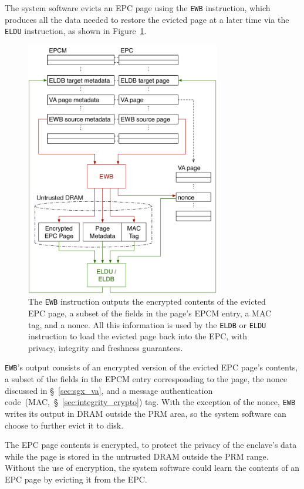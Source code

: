 The system software evicts an EPC page using the \texttt{EWB} instruction,
which produces all the data needed to restore the evicted page at a later time
via the \texttt{ELDU} instruction, as shown in Figure~\ref{fig:sgx_eviction}.

\begin{figure}[hbt]
  \centering
  \includegraphics[width=85mm]{figures/sgx_eviction.pdf}
  \caption{
    The \texttt{EWB} instruction outputs the encrypted contents of the
    evicted EPC page, a subset of the fields in the page's EPCM entry, a
    MAC tag, and a nonce. All this information is used by the \texttt{ELDB} or
    \texttt{ELDU} instruction to load the evicted page back into the EPC, with
    privacy, integrity and freshness guarantees.
  }
  \label{fig:sgx_eviction}
\end{figure}


\texttt{EWB}'s output consists of an encrypted version of the evicted EPC
page's contents, a subset of the fields in the EPCM entry corresponding to the
page, the nonce discussed in \S~\ref{sec:sgx_va}, and a message authentication
code~(MAC,~\S~\ref{sec:integrity_crypto}) tag. With the exception of the nonce,
\texttt{EWB} writes its output in DRAM outside the PRM area, so the system
software can choose to further evict it to disk.

The EPC page contents is encrypted, to protect the privacy of the enclave's
data while the page is stored in the untrusted DRAM outside the PRM range.
Without the use of encryption, the system software could learn the contents of
an EPC page by evicting it from the EPC.

